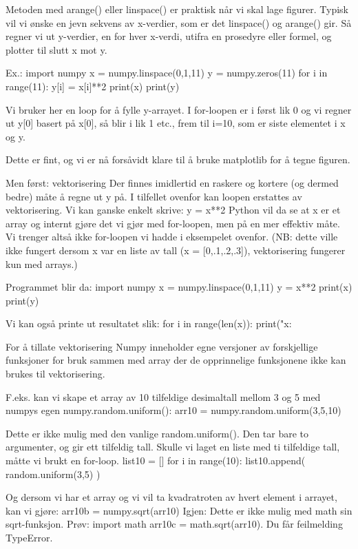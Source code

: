 \documentclass[a4paper,11pt,utf8]{book}
\begin{document}
Metoden med arange() eller linspace() er praktisk når vi skal lage figurer. 
Typisk vil vi ønske en jevn sekvens av x-verdier, som er det linspace() og arange() gir.  
Så regner vi ut y-verdier, en for hver x-verdi, utifra en prosedyre eller formel, 
og plotter til slutt x mot y. 

Ex.:
import numpy
x = numpy.linspace(0,1,11)
y = numpy.zeros(11)
for i in range(11): 
    y[i] = x[i]**2
print(x)
print(y)

Vi bruker her en loop for å fylle y-arrayet.
I for-loopen er i først lik 0 og vi regner ut y[0] basert på x[0], så blir i lik 1 etc., 
frem til i=10, som er siste elementet i x og y. 

Dette er fint, og vi er nå forsåvidt klare til å bruke matplotlib for å tegne figuren.


Men først: vektorisering
Der finnes imidlertid en raskere og kortere (og dermed bedre) måte å regne ut y på.
I tilfellet ovenfor kan loopen erstattes av vektorisering. 
Vi kan ganske enkelt skrive:
y = x**2
Python vil da se at x er et array og internt gjøre det vi gjør med for-loopen, 
men på en mer effektiv måte.
Vi trenger altså ikke for-loopen vi hadde i eksempelet ovenfor. 
(NB: dette ville ikke fungert dersom x var en liste av tall (x = [0,.1,.2,.3]), 
vektorisering fungerer kun med arrays.) 



Programmet blir da:
import numpy
x = numpy.linspace(0,1,11)
y = x**2
print(x)
print(y)

Vi kan også printe ut resultatet slik:
for i in range(len(x)):
    print("x:%


For å tillate vektorisering
Numpy inneholder egne versjoner av forskjellige funksjoner for bruk sammen med array 
der de opprinnelige funksjonene ikke kan brukes til vektorisering. 

F.eks. kan vi skape et array av 10 tilfeldige desimaltall mellom 3 og 5 med numpys 
egen numpy.random.uniform(): 
arr10 = numpy.random.uniform(3,5,10)

Dette er ikke mulig med den vanlige random.uniform(). 
Den tar bare to argumenter, og gir ett tilfeldig tall. 
Skulle vi laget en liste med ti tilfeldige tall, måtte vi brukt en for-loop. 
list10 = []
for i in range(10): 
    list10.append( random.uniform(3,5) ) 


Og dersom vi har et array og vi vil ta kvadratroten av hvert element i arrayet, 
kan vi gjøre: 
arr10b = numpy.sqrt(arr10)
Igjen: Dette er ikke mulig med math sin sqrt-funksjon. 
Prøv: 
import math 
arr10c = math.sqrt(arr10). 
Du får feilmelding TypeError. 
\end{document}
